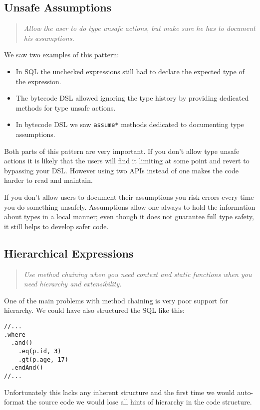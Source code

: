 \documentclass{sig-alternate}
\begin{document}
\subsection{Unsafe Assumptions}

\begin{quote}
\emph{Allow the user to do type unsafe actions, but make sure he has to document his assumptions.}
\end{quote}

We saw two examples of this pattern:
\begin{itemize}
\item In SQL the unchecked expressions still had to declare the expected type of the expression.
\item The bytecode DSL allowed ignoring the type history by providing dedicated methods for type unsafe actions.
\item In bytecode DSL we saw \verb!assume*! methods dedicated to documenting type assumptions.
\end{itemize}

Both parts of this pattern are very important. If you don't allow type unsafe actions it is likely that the users will find it limiting at some point and revert to bypassing your DSL. However using two APIs instead of one makes the code harder to read and maintain.

If you don't allow users to document their assumptions you risk errors every time you do something unsafely. Assumptions allow one always to hold the information about types in a local manner; even though it does not guarantee full type safety, it still helps to develop safer code.

\subsection{Hierarchical Expressions}

\begin{quote}
\emph{Use method chaining when you need context and static functions when you need hierarchy and extensibility.}
\end{quote}

One of the main problems with method chaining is very poor support for hierarchy. We could have also structured the SQL like this:
\begin{verbatim}
//...
.where
  .and()
    .eq(p.id, 3)
    .gt(p.age, 17)
  .endAnd()
//...  
\end{verbatim}
Unfortunately this lacks any inherent structure and the first time we would auto-format the source code we would lose all hints of hierarchy in the code structure.
\end{document}
